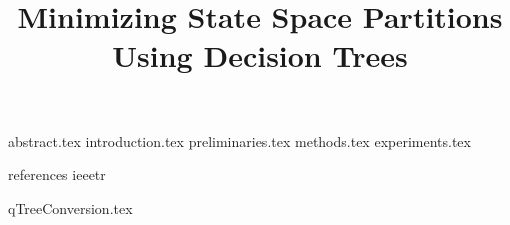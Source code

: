 \documentclass [
  letterpaper,
  10 pt,
  conference
] {IEEEconf}
\title {Minimizing State Space Partitions Using Decision Trees}
\author {%
  \authorblockN {Andreas Holck Høeg-Petersen}
  \authorblockA {Aalborg University\\ Denmark}
  \and
  \authorblockN {Kim Guldstrand Larsen}
  \authorblockA {Aalborg University\\ Denmark}
  \and
  \authorblockN {Peter Gjøl Jensen}
  \authorblockA {Aalborg University\\ Denmark}
  \and
  \authorblockN {Andrzej Wąsowski}
  \authorblockA {IT University of Copenhagen\\ Denmark}
}
\begin{document}
\maketitle

 {abstract.tex}
 {introduction.tex}
 {preliminaries.tex}
 {methods.tex}
 {experiments.tex}

\newpage

 {references}
 {ieeetr}

\appendix

 {qTreeConversion.tex}
\end{document}
